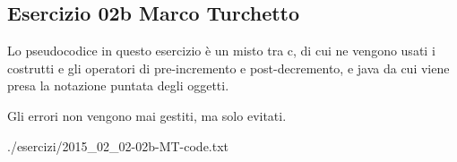 
\subsection[02b MT]{Esercizio 02b Marco Turchetto}

Lo pseudocodice in questo esercizio è un misto tra c, di cui ne vengono usati i costrutti e
	gli operatori di pre-incremento e post-decremento, e java da cui viene presa la notazione
	puntata degli oggetti.

Gli errori non vengono mai gestiti, ma solo evitati.


			{./esercizi/2015_02_02-02b-MT-code.txt}
			
